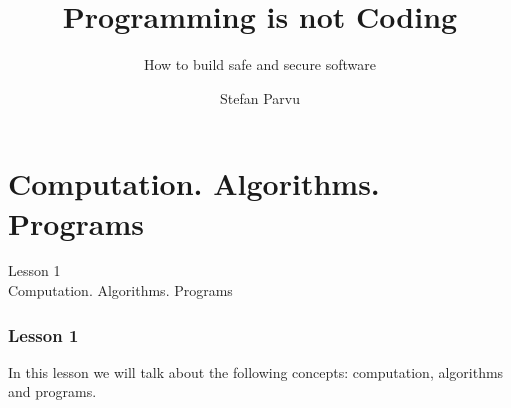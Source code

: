 \documentclass[aspectratio=1610]{beamer}
\title{\huge{Programming is not Coding}}
\subtitle{How to build safe and secure software}
\author{Stefan Parvu}
\begin{document}
\begin{frame}
\end{frame}


\begin{frame}
	\maketitle %
\end{frame}



\section{Computation. Algorithms. Programs}

\begin{frame}
\begin{center}
\Huge Lesson 1\\
Computation. Algorithms. Programs
\end{center}
\end{frame}


\begin{frame}
\frametitle{Lesson 1}

\Huge In this lesson we will talk about the following concepts:
 \alert{computation},
 \alert{algorithms} and
 \alert{programs}. 

\end{frame}
\end{document}
